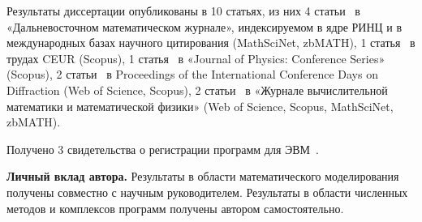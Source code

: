     {\publications}
    Результаты диссертации опубликованы в 10 статьях, из них 4
    статьи~\cite{mesenev_23_opt, mesenev_22_penalty, mesenev_20_alg, mesenev_18_boundary}
    в «Дальневосточном математическом журнале», индексируемом
    в ядре РИНЦ и в международных базах научного цитирования (MathSciNet,
    zbMATH), 1 статья~\cite{mesenev_20_opt_proc} в трудах CEUR (Scopus),
    1 статья~\cite{mesenev_23_math}
    в «Journal of Physics: Conference Series» (Scopus),
    2 статьи~\cite{mesenev_21_optimal_proc, mesenev_23_inv_proc}
    в Proceedings of the International Conference Days on Diffraction (Web of Science, Scopus),
    2 статьи~\cite{mesenev_23_problem, Mesenev_22_analysis}
    в «Журнале вычислительной математики и математической физики»
    (Web of Science, Scopus, MathSciNet, zbMATH).

    Получено 3 свидетельства о регистрации программ для ЭВМ~\cite{progbib1, progbib2, progbib3}.

    \textbf{Личный вклад автора.}
    Результаты в области математического моделирования получены совместно с научным руководителем.
    Результаты в области численных методов и комплексов программ получены автором самостоятельно.
